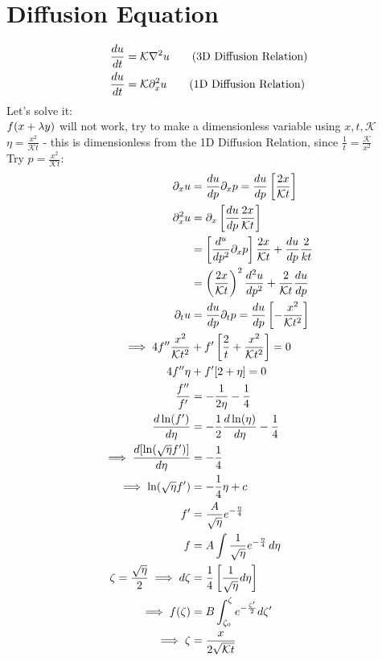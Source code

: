 \documentclass[Maths.tex]{subfiles}
\begin{document}
\section{Diffusion Equation}
\begin{align}
	\frac{du}{dt} &= \mathcal{K}\nabla^2u \tag{3D Diffusion Relation} \\
	\frac{du}{dt} &= \mathcal{K}\partial_x^2u \tag{1D Diffusion Relation}
\end{align}
Let's solve it: \\
$f(x+\lambda y)$ will not work, try to make a dimensionless variable using $x, t,\mathcal{K}$ \\
$\eta = \frac{x^2}{\mathcal{K}t}$ - this is dimensionless from the 1D Diffusion Relation, since $\frac{1}{t} = \frac{\mathcal{K}}{x^2}$ \\
Try $p = \frac{x^2}{\mathcal{K}t}$:
\begin{align}
	\partial_xu &= \frac{du}{dp} \partial_xp = \frac{du}{dp}\left[\frac{2x}{\mathcal{K}t}\right] \\
	\partial_x^2u &= \partial_x\left[\frac{du}{dp}\frac{2x}{\mathcal{K}t}\right] \\
		  	&= \left[\frac{d^u}{dp^2}\partial_xp\right]\frac{2x}{\mathcal{K}t} + \frac{du}{dp}\frac{2}{kt} \\
			&= \left(\frac{2x}{\mathcal{K}t}\right)^2\frac{d^2u}{dp^2} + \frac{2}{\mathcal{K}t}\frac{du}{dp} \\
	\partial_tu 	&= \frac{du}{dp}\partial_tp = \frac{du}{dp}\left[-\frac{x^2}{\mathcal{K}t^2}\right] \\
	\implies 4f''\frac{x^2}{\mathcal{K}t^2} &+ f'\left[\frac{2}{t} + \frac{x^2}{\mathcal{K}t^2}\right] = 0 \\
	4f''\eta &+ f'[2 + \eta] = 0 \\
	\frac{f''}{f'} &= -\frac{1}{2\eta} - \frac{1}{4} \\
	\frac{d\ln(f')}{d\eta} &= -\frac{1}{2} \frac{d\ln(\eta)}{d\eta} - \frac{1}{4} \\
	\implies \frac{d[\ln(\sqrt{\eta}f')]}{d\eta} &= -\frac{1}{4} \\
	\implies \ln(\sqrt{\eta}f') &= -\frac{1}{4}\eta + c \\
	f' &= \frac{A}{\sqrt{\eta}}e^{-\frac{\eta}{4}} \\
	f &= A\int \frac{1}{\sqrt{\eta}}e^{-\frac{\eta}{4}}\,d\eta \\
	\zeta = \frac{\sqrt{\eta}}{2} \implies d\zeta &= \frac{1}{4}\left[\frac{1}{\sqrt{\eta}}d\eta\right] \\
	\implies f(\zeta) &= B \int_{\zeta_0}^{\zeta} e^{-\frac{\zeta'}{2}}d\zeta' \\
	\implies \zeta &= \frac{x}{2\sqrt{\mathcal{K}t}}
\end{align}
\end{document}
